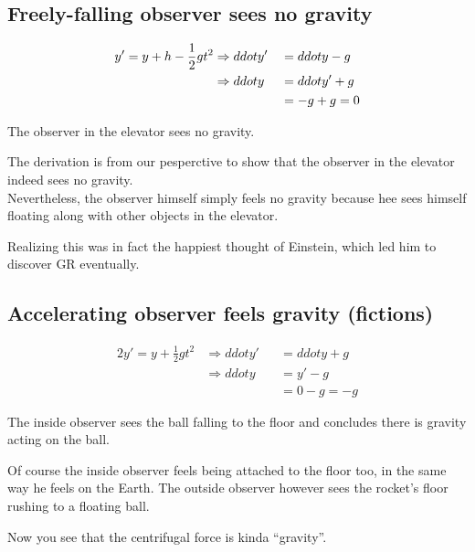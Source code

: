 \documentclass[11pt,fleqn]{book} %
\begin{document}
\subsection{Freely-falling observer sees no gravity}
\begin{figure}[h]
\centering
\end{figure}
\begin{alignat*}{2}
  y' = y + h - \frac{1}{2}gt^2 &\Rightarrow dd ot{y}' &&= dd ot{y} - g \hfill  \\
                               &\Rightarrow dd ot{y}  &&= dd ot{y}' + g \hfill \\
                               &\                     &&= -g + g = 0 \hfill
\end{alignat*}
\begin{emphbox}
  The observer in the elevator sees no gravity.
\end{emphbox}
\begin{remark}
  The derivation is from our pesperctive to show that the observer in the
  elevator indeed sees no gravity. \\
  Nevertheless, the observer himself simply feels no gravity because hee sees
  himself floating along with other objects in the elevator.
\end{remark}
Realizing this was in fact the happiest thought of Einstein, which led him to
discover GR eventually.

\subsection{Accelerating observer feels gravity (fictions)}
\begin{figure}[h]
\centering
\end{figure}
\begin{alignat*}{2}
  y' = y + \frac{1}{2}gt^2 & \Rightarrow dd ot{y}' && = dd ot{y} + g \\
                           & \Rightarrow dd ot{y}  && = y' -g        \\
                           & \                     && = 0-g = -g
\end{alignat*}
\begin{emphbox}
  The inside observer sees the ball falling to the floor and concludes there is
  gravity acting on the ball.
\end{emphbox}
\begin{remark}
  Of course the inside observer feels being attached to the floor too, in the
  same way he feels on the Earth.
  The outside observer however sees the rocket's floor rushing to a floating ball.
\end{remark}
  Now you see that the centrifugal force is kinda ``gravity''.
\end{document}
